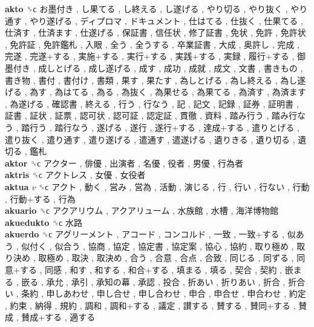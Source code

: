 \textbf{akto} ␝ϲ   お墨付き ,  し果てる ,  し終える ,  し遂げる ,  やり切る ,  やり抜く ,  やり通す ,  やり遂げる ,  ディプロマ ,  ドキュメント ,  仕はてる ,  仕抜く ,  仕果てる ,  仕済す ,  仕済ます ,  仕遂げる ,  保証書 ,  信任状 ,  修了証書 ,  免状 ,  免許 ,  免許状 ,  免許証 ,  免許鑑札 ,  入眼 ,  全う ,  全うする ,  卒業証書 ,  大成 ,  奥許し ,  完成 ,  完遂 ,  完遂+する ,  実施+する ,  実行+する ,  実践+する ,  実録 ,  履行+する ,  御墨付き ,  成しとげる ,  成し遂げる ,  成す ,  成功 ,  成就 ,  成文 ,  文書 ,  書きもの ,  書き物 ,  書付 ,  書付け ,  書類 ,  果す ,  果たす ,  為しとげる ,  為し終える ,  為し遂げる ,  為す ,  為はてる ,  為る ,  為抜く ,  為果せる ,  為果てる ,  為済す ,  為済ます ,  為遂げる ,  確認書 ,  終える ,  行う ,  行なう ,  記 ,  記文 ,  記録 ,  証券 ,  証明書 ,  証書 ,  証状 ,  証票 ,  認可状 ,  認可証 ,  認定証 ,  貫徹 ,  資料 ,  踏み行う ,  踏み行なう ,  踏行う ,  踏行なう ,  遂げる ,  遂行 ,  遂行+する ,  達成+する ,  遣りとげる ,  遣り抜く ,  遣り通す ,  遣り遂げる ,  遣通す ,  遣遂げる ,  遺りきる ,  遺り切る ,  遺切る ,  鑑札   \\
\textbf{aktor} ␝ϲ   アクター ,  俳優 ,  出演者 ,  名優 ,  役者 ,  男優 ,  行為者   \\
\textbf{aktris} ␝ϲ   アクトレス ,  女優 ,  女役者   \\
\textbf{aktua} \emph{v}  ␝ϲ   アクト ,  動く ,  営み ,  営為 ,  活動 ,  演じる ,  行 ,  行い ,  行ない ,  行動 ,  行動+する ,  行為   \\
\textbf{akuario} ␝ϲ   アクアリウム ,  アクアリューム ,  水族館 ,  水槽 ,  海洋博物館   \\
\textbf{akuedukto} ␝ϲ   水路   \\
\textbf{akuerdo} ␝ϲ   アグリーメント ,  アコード ,  コンコルド ,  一致 ,  一致+する ,  似あう ,  似付く ,  似合う ,  協商 ,  協定 ,  協定書 ,  協定案 ,  協心 ,  協約 ,  取り極め ,  取り決め ,  取極め ,  取決 ,  取決め ,  合う ,  合意 ,  合点 ,  合致 ,  同じる ,  同ずる ,  同意+する ,  同感 ,  和す ,  和する ,  和合+する ,  填まる ,  填る ,  契合 ,  契約 ,  嵌まる ,  嵌る ,  承允 ,  承引 ,  承知の幕 ,  承認 ,  投合 ,  折あい ,  折りあい ,  折合 ,  折合い ,  条約 ,  申しあわせ ,  申し合せ ,  申し合わせ ,  申合 ,  申合せ ,  申合わせ ,  約定 ,  約束 ,  納得 ,  規約 ,  調和 ,  調和+する ,  議定 ,  讃する ,  賛する ,  賛同+する ,  賛成 ,  賛成+する ,  適する   \\
